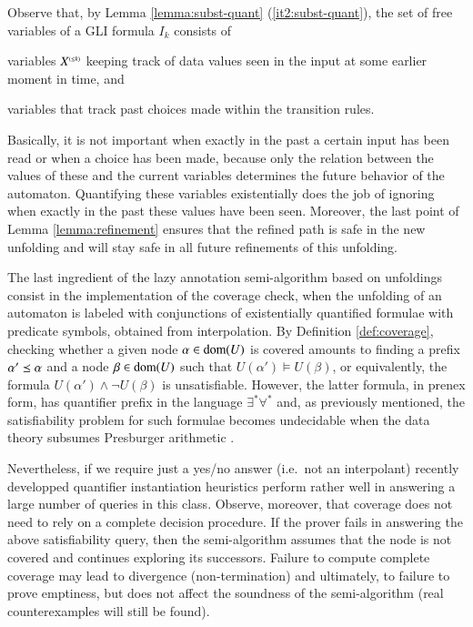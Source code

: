 Observe that, by Lemma \ref{lemma:subst-quant}
(\ref{it2:subst-quant}), the set of free variables of a GLI formula
$I_k$ consists of \begin{inparaenum}[(i)]
\item variables ${X}^{\scriptscriptstyle{({\leq k})}}$ keeping track of data values seen
  in the input at some earlier moment in time, and
%
\item variables that track past choices made within the transition
  rules.
\end{inparaenum}
Basically, it is not important when exactly in the past a certain
input has been read or when a choice has been made, because only the
relation between the values of these and the current variables
determines the future behavior of the automaton. Quantifying these
variables existentially does the job of ignoring when exactly in the
past these values have been seen. Moreover, the last point of Lemma
\ref{lemma:refinement} ensures that the refined path is safe in the
new unfolding and will stay safe in all future refinements of this
unfolding.

The last ingredient of the lazy annotation semi-algorithm based on
unfoldings consist in the implementation of the coverage check, when
the unfolding of an automaton is labeled with conjunctions of
existentially quantified formulae with predicate symbols, obtained
from interpolation. By Definition \ref{def:coverage}, checking whether
a given node $\alpha \in \mathrm{dom}(U)$ is covered amounts to finding a
prefix $\alpha' \preceq \alpha$ and a node $\beta \in \mathrm{dom}(U)$ such
that $U(\alpha') \models U(\beta)$, or equivalently, the formula
$U(\alpha') \wedge \neg U(\beta)$ is unsatisfiable. However, the
latter formula, in prenex form, has quantifier prefix in the language
$\exists^*\forall^*$ and, as previously mentioned, the satisfiability
problem for such formulae becomes undecidable when the data theory
subsumes Presburger arithmetic \cite{Halpern91}.

Nevertheless, if we require just a yes/no answer (i.e.\ not an
interpolant) recently developped quantifier instantiation heuristics
\cite{ReynoldsKK17} perform rather well in answering a large number of
queries in this class. Observe, moreover, that coverage does not need
to rely on a complete decision procedure. If the prover fails in
answering the above satisfiability query, then the semi-algorithm
assumes that the node is not covered and continues exploring its
successors. Failure to compute complete coverage may lead to
divergence (non-termination) and ultimately, to failure to prove
emptiness, but does not affect the soundness of the semi-algorithm
(real counterexamples will still be found).

